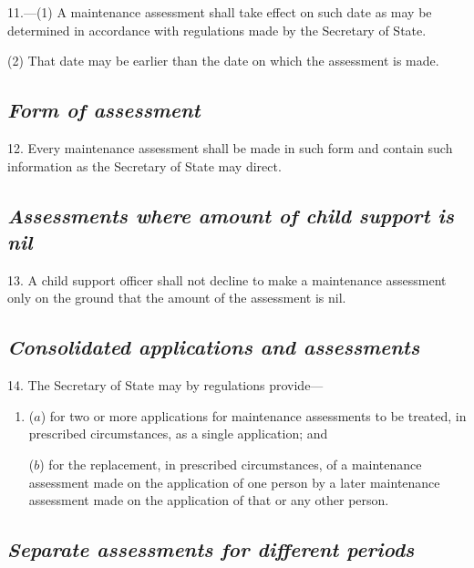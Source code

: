 \documentclass[12pt,a4paper]{article}
\begin{document}
11.---(1) A maintenance assessment shall take effect on such date as may be determined in accordance with regulations made by the Secretary of State.

(2) That date may be earlier than the date on which the assessment is made.


\subsection*{\itshape Form of assessment}

12. Every maintenance assessment shall be made in such form and contain such information as the Secretary of State may direct.

\subsection*{\itshape Assessments where amount of child support is nil}

13. A child support officer shall not decline to make a maintenance assessment only on the ground that the amount of the assessment is nil.

\subsection*{\itshape Consolidated applications and assessments}

14. The Secretary of State may by regulations provide—
\begin{enumerate}\item[]
($a$) for two or more applications for maintenance assessments to be treated, in prescribed circumstances, as a single application; and

($b$) for the replacement, in prescribed circumstances, of a maintenance assessment made on the application of one person by a later maintenance assessment made on the application of that or any other person.
\end{enumerate}


\subsection*{\itshape Separate assessments for different periods}
\end{document}
